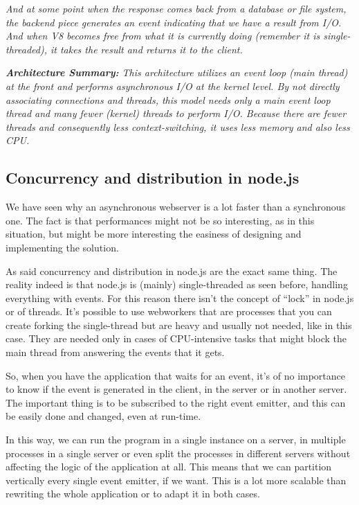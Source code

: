 \textit{And at some point when the response comes back from a database or file system, the backend piece generates an event indicating that we have a result from I/O. And when V8 becomes free from what it is currently doing (remember it is single-threaded), it takes the result and returns it to the client.}

\textit{\textbf{Architecture Summary:} This architecture utilizes an event loop (main thread) at the front and performs asynchronous I/O at the kernel level. By not directly associating connections and threads, this model needs only a main event loop thread and many fewer (kernel) threads to perform I/O. Because there are fewer threads and consequently less context-switching, it uses less memory and also less CPU.}

\subsection{Concurrency and distribution in node.js}

We have seen why an asynchronous webserver is a lot faster than a synchronous one. The fact is that performances might not be so interesting, as in this situation, but might be more interesting the easiness of designing and implementing the solution.

As said concurrency and distribution in node.js are the exact same thing. The reality indeed is that node.js is (mainly) single-threaded as seen before, handling everything with events. For this reason there isn't the concept of ``lock'' in node.js or of threads. It's possible to use webworkers that are processes that you can create forking the single-thread but are heavy and usually not needed, like in this case. They are needed only in cases of CPU-intensive tasks that might block the main thread from answering the events that it gets.

So, when you have the application that waits for an event, it's of no importance to know if the event is generated in the client, in the server or in another server. The important thing is to be subscribed to the right event emitter, and this can be easily done and changed, even at run-time.

In this way, we can run the program in a single instance on a server, in multiple processes in a single server or even split the processes in different servers without affecting the logic of the application at all. This means that we can partition vertically every single event emitter, if we want. This is a lot more scalable than rewriting the whole application or to adapt it in both cases.

